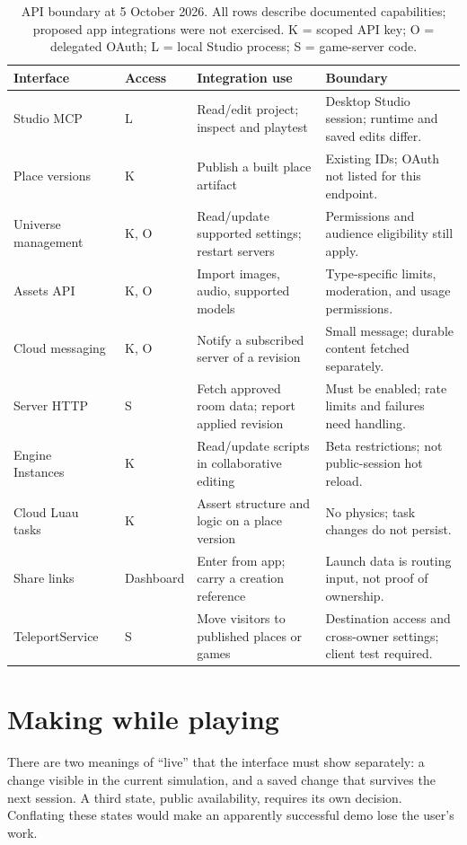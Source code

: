 \documentclass[10pt,letterpaper,twocolumn]{article}
\begin{document}
\begin{table}[t]
\centering\small
\caption{API boundary at 5 October 2026. All rows describe documented capabilities; proposed app integrations were not exercised. K = scoped API key; O = delegated OAuth; L = local Studio process; S = game-server code.}
\label{tab:api}
\begin{tabularx}{\textwidth}{@{}p{}p{}YY@{}}
\toprule
Interface & Access & Integration use & Boundary \\
\midrule
Studio MCP~\cite{mcp} & L & Read/edit project; inspect and playtest & Desktop Studio session; runtime and saved edits differ. \\
Place versions~\cite{places,publishing} & K & Publish a built place artifact & Existing IDs; OAuth not listed for this endpoint. \\
Universe management~\cite{universes} & K, O & Read/update supported settings; restart servers & Permissions and audience eligibility still apply. \\
Assets API~\cite{assets} & K, O & Import images, audio, supported models & Type-specific limits, moderation, and usage permissions. \\
Cloud messaging~\cite{messaging} & K, O & Notify a subscribed server of a revision & Small message; durable content fetched separately. \\
Server HTTP~\cite{http} & S & Fetch approved room data; report applied revision & Must be enabled; rate limits and failures need handling. \\
Engine Instances~\cite{instances} & K & Read/update scripts in collaborative editing & Beta restrictions; not public-session hot reload. \\
Cloud Luau tasks~\cite{luau} & K & Assert structure and logic on a place version & No physics; task changes do not persist. \\
Share links~\cite{share} & Dashboard & Enter from app; carry a creation reference & Launch data is routing input, not proof of ownership. \\
TeleportService~\cite{teleport} & S & Move visitors to published places or games & Destination access and cross-owner settings; client test required. \\
\bottomrule
\end{tabularx}
\end{table}

\section{Making while playing}
There are two meanings of ``live'' that the interface must show separately: a change visible in the current simulation, and a saved change that survives the next session. A third state, public availability, requires its own decision. Conflating these states would make an apparently successful demo lose the user's work.
\end{document}
